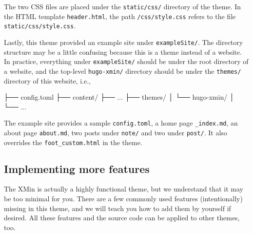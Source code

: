 \documentclass[12pt,]{krantz}
\makeatletter
\newenvironment{Shaded}{\begin{snugshade}}{\end{snugshade}}
\newcommand{\ExtensionTok}[1]{#1}
\newcommand{\NormalTok}[1]{#1}
\newenvironment{kframe}{%
\medskip{}
\setlength{\fboxsep}{.8em}
 \def\at@end@of@kframe{}%
 \ifinner\ifhmode%
  \def\at@end@of@kframe{\end{minipage}}%
  \begin{minipage}{\columnwidth}%
 \fi\fi%
 \def\FrameCommand##1{\hskip\@totalleftmargin \hskip-\fboxsep
 \colorbox{shadecolor}{##1}\hskip-\fboxsep
     \hskip-\linewidth \hskip-\@totalleftmargin \hskip\columnwidth}%
 \MakeFramed {\advance\hsize-\width
   \@totalleftmargin\z@ \linewidth\hsize
   \@setminipage}}%
 {\par\unskip\endMakeFramed%
 \at@end@of@kframe}
\renewenvironment{Shaded}{\begin{kframe}}{\end{kframe}}
\theoremstyle{definition}
\theoremstyle{definition}
\theoremstyle{definition}
\theoremstyle{remark}
\makeatother
\begin{document}
The two CSS files are placed under the \texttt{static/css/} directory of
the theme. In the HTML template \texttt{header.html}, the path
\texttt{/css/style.css} refers to the file
\texttt{static/css/style.css}.

Lastly, this theme provided an example site under \texttt{exampleSite/}.
The directory structure may be a little confusing because this is a
theme instead of a website. In practice, everything under
\texttt{exampleSite/} should be under the root directory of a website,
and the top-level \texttt{hugo-xmin/} directory should be under the
\texttt{themes/} directory of this website, i.e.,

\begin{Shaded}
\begin{Highlighting}[]
\NormalTok{├── }\ExtensionTok{config.toml}
\NormalTok{├── }\ExtensionTok{content/}
\NormalTok{├── }\ExtensionTok{...}
\NormalTok{├── }\ExtensionTok{themes/}
\NormalTok{│   └── }\ExtensionTok{hugo-xmin/}
\NormalTok{│}
\NormalTok{└── }\ExtensionTok{...}
\end{Highlighting}
\end{Shaded}

The example site provides a sample \texttt{config.toml}, a home page
\texttt{\_index.md}, an about page \texttt{about.md}, two posts under
\texttt{note/} and two under \texttt{post/}. It also overrides the
\texttt{foot\_custom.html} in the theme.

\subsection{Implementing more features}\label{how-to}

The XMin is actually a highly functional theme, but we understand that
it may be too minimal for you. There are a few commonly used features
(intentionally) missing in this theme, and we will teach you how to add
them by yourself if desired. All these features and the source code can
be applied to other themes, too.
\end{document}

